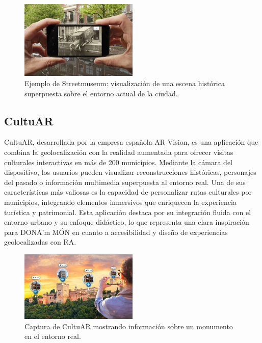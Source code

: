 \begin{figure}[H]
    \centering
    \includegraphics[width=0.5\textwidth]{figs/streetmuseum.png}
    \caption{Ejemplo de Streetmuseum: visualización de una escena histórica superpuesta sobre el entorno actual de la ciudad.}
    \label{fig:streetmuseum}
\end{figure}

\subsection{CultuAR}

CultuAR, desarrollada por la empresa española AR Vision, es una aplicación que combina la geolocalización con la realidad aumentada para ofrecer visitas culturales interactivas en más de 200 municipios. Mediante la cámara del dispositivo, los usuarios pueden visualizar reconstrucciones históricas, personajes del pasado o información multimedia superpuesta al entorno real. Una de sus características más valiosas es la capacidad de personalizar rutas culturales por municipios, integrando elementos inmersivos que enriquecen la experiencia turística y patrimonial. Esta aplicación destaca por su integración fluida con el entorno urbano y su enfoque didáctico, lo que representa una clara inspiración para DONA'm MÓN en cuanto a accesibilidad y diseño de experiencias geolocalizadas con RA.

\begin{figure}[H]
    \centering
    \includegraphics[width=0.5\textwidth]{figs/cultuar.jpeg}
    \caption{Captura de CultuAR mostrando información sobre un monumento en el entorno real.}
    \label{fig:cultuar}
\end{figure}

